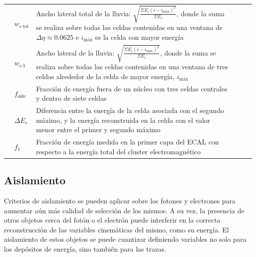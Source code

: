 \begin{table}
\begin{tabular}{ l p{2cm} p{8cm} c c c}
		 & $w_{s\:\text{tot}}$ & Ancho lateral total de la lluvia: $\sqrt{\frac{\Sigma E_{i}(i-i_{\text{máx}})^{2}}{\Sigma E_{i}}}$, donde la suma se realiza sobre todas las celdas contenidas en una ventana de $\Delta\eta\approx0.0625$ e $i_{\text{máx}}$ es la celda con mayor energía & \xmark & \xmark & \cmark \\

		 & $w_{s\:\text{3}}$ & Ancho lateral de la lluvia: $\sqrt{\frac{\Sigma E_{i}(i-i_{\text{máx}})^{2}}{\Sigma E_{i}}}$, donde la suma se realiza sobre todas las celdas contenidas en una ventana de tres celdas alrededor de la celda de mayor energía, $i_{\text{máx}}$ & \xmark & \xmark & \cmark \\

		 & $f_{\text{side}}$ & Fracción de energía fuera de un núcleo con tres celdas centrales y dentro de siete celdas & \xmark & \xmark & \cmark \\

		 & $\Delta E_{s}$ & Diferencia entre la energía de la celda asociada con el segundo máximo, y la energía reconstruida en la celda con el valor menor entre el primer y segundo máximo & \xmark & \xmark & \cmark \\

		 & $f_{\text{1}}$ & Fracción de energía medida en la primer capa del ECAL con respecto a la energía total del cluster electromagnético & \xmark & \xmark & \cmark \\




	\end{tabular}

\label{phIDVars}
\end{table}




\subsection{Aislamiento}
\label{isolation}


Criterios de aislamiento se pueden aplicar sobre los fotones y electrones para aumentar aún más calidad de selección de los mismos. A su vez, la presencia de otros objetos cerca del fotón o el electrón puede interferir en la correcta reconstrucción de las variables cinemáticas del mismo, como su energía. El aislamiento de estos objetos se puede cuantizar definiendo variables no solo para los depósitos de energía, sino también para las trazas.

